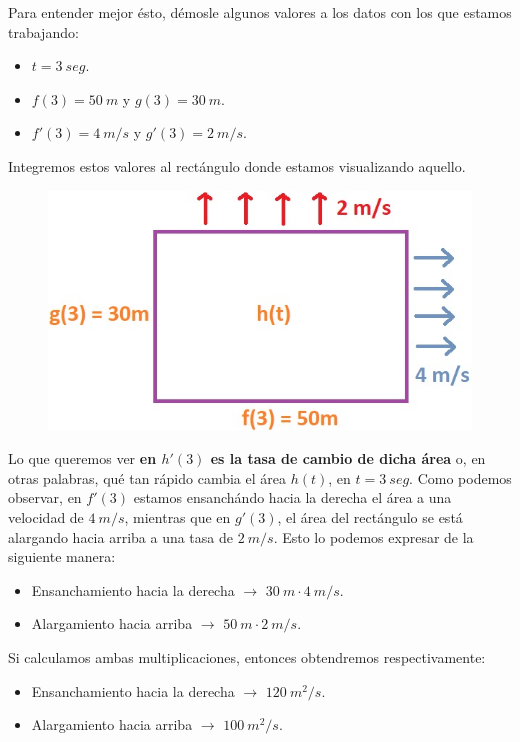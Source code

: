 \documentclass[12pt]{article}
\begin{document}
Para entender mejor ésto, démosle algunos valores a los datos con los que estamos trabajando:

\begin{itemize}
\item $t = 3 \ seg$.
\item $f(3) = 50 \ m$ y $g(3) = 30 \ m$.
\item $f'(3) = 4 \ m/s$ y $g'(3) = 2 \ m/s$.
\end{itemize}

Integremos estos valores al rectángulo donde estamos visualizando aquello.

\begin{figure}[hbt!]
\centering
\includegraphics[scale=0.7]{img/deriv_prod_examp_2.jpg}
\end{figure}

Lo que queremos ver \textbf{en $h'(3)$ es la tasa de cambio de dicha área} o, en otras palabras, qué tan rápido cambia el área $h(t)$, en $t = 3 \ seg$. Como podemos observar, en $f'(3)$ estamos ensanchándo hacia la derecha el área a una velocidad de $4 \ m/s$, mientras que en $g'(3)$, el área del rectángulo se está alargando hacia arriba a una tasa de $2 \ m/s$. Esto lo podemos expresar de la siguiente manera:

\begin{itemize}
\item Ensanchamiento hacia la derecha $\rightarrow$ $30 \ m \cdot 4 \ m/s$.
\item Alargamiento hacia arriba $\rightarrow$ $50 \ m \cdot 2 \ m/s$.
\end{itemize}

Si calculamos ambas multiplicaciones, entonces obtendremos respectivamente:

\begin{itemize}
\item Ensanchamiento hacia la derecha $\rightarrow$ $120 \ m^{2}/s$.
\item Alargamiento hacia arriba $\rightarrow$ $100 \ m^{2}/s$.
\end{itemize}
\end{document}

